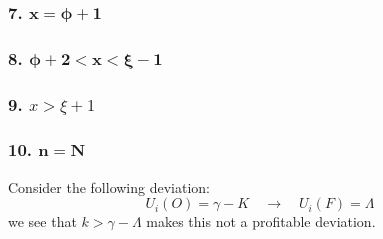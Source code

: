 \documentclass[12pt]{article}
\begin{document}
\subsubsection*{7. $\mathbf{x = \phi + 1}$}
\subsubsection*{8. $\mathbf{\phi + 2 < x < \xi -1}$}
\subsubsection*{9. $x > \xi + 1$}
\subsubsection*{10. $\mathbf{n = N}$}
Consider the following deviation:
\[
U_i(O) = \gamma - K \quad \to \quad  U_i(F) = \Lambda 
\]
we see that $k > \gamma - \Lambda$ makes this not a profitable deviation. 
\end{document}
